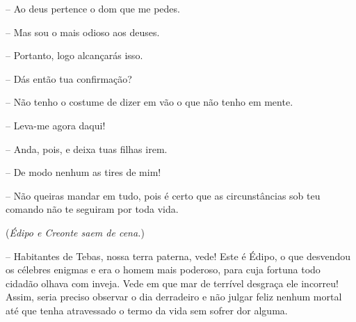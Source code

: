  --   Ao deus pertence o dom que me pedes.

 --   Mas sou o mais odioso aos deuses.

 --   Portanto, logo alcançarás isso.

 --    Dás então tua confirmação?

 --   Não tenho o costume de dizer em vão o que não tenho em mente.

 --   Leva-me agora daqui!

 --   Anda, pois, e deixa tuas filhas irem.

 --   De modo nenhum as tires de mim!

 --   Não queiras mandar em tudo, pois é certo que as circunstâncias sob teu
comando não te seguiram por toda vida.

(\emph{Édipo e Creonte saem de cena.})

 --   Habitantes de Tebas, nossa terra paterna, vede! Este é Édipo, o que
desvendou os célebres enigmas e era o homem mais poderoso, para cuja
fortuna todo cidadão olhava com inveja. Vede em que mar de terrível
desgraça ele incorreu! Assim, seria preciso observar o dia derradeiro e
não julgar feliz nenhum mortal até que tenha  atravessado o termo
da vida sem sofrer dor alguma.

\endgroup %



